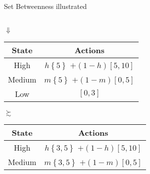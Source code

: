 \documentclass[usenames,dvipsnames,aspectratio=169,11pt, envcountsect, handout]{beamer}
\begin{document}
\begin{frame}{Set Betweenness illustrated}
\begin{table}[H]
\begin{minipage}{0.45\textwidth}
\begin{tabular}{c | c}
			\end{tabular}
		\end{minipage}
	\end{table}
	\vspace{-0.5cm}
	\begin{center}
		\( \Downarrow \)
	\end{center}
	\vspace{-0.5cm}
	\begin{table}[H]
		\centering
		\begin{minipage}{0.45\textwidth}
			\centering
			\begin{tabular}{c | c}
				State                          & Actions                                                                                       \\
				\hline
				{\color{bleudefrance} High}    & {\color{bleudefrance}\( h \left\{ 5 \right\} \) } \(+ \left(1-h \right) \left[5,10 \right] \) \\
				{\color{bleudefrance} Medium } & {\color{bleudefrance}\( m \left\{ 5 \right\} \) } \(+ \left(1-m \right) \left[0,5 \right] \)  \\
				Low                            & \( \left[0,3 \right] \)                                                                       \\
			\end{tabular}
		\end{minipage}\hspace{0.25cm} %
		\( \succsim \) %
		\hspace{0.25cm}
		\begin{minipage}{0.45\textwidth}
			\centering
			\begin{tabular}{c | c}
				State                          & Actions                                                                                         \\
				\hline
				{\color{bleudefrance} High}    & {\color{bleudefrance}\( h \left\{ 3,5 \right\} \) } \(+ \left(1-h \right) \left[5,10 \right] \) \\
				{\color{bleudefrance} Medium } & {\color{bleudefrance}\( m \left\{ 3,5 \right\} \) } \(+ \left(1-m \right) \left[0,5 \right] \)  \\

\end{tabular}
\end{minipage}
\end{table}
\end{frame}
\end{document}
